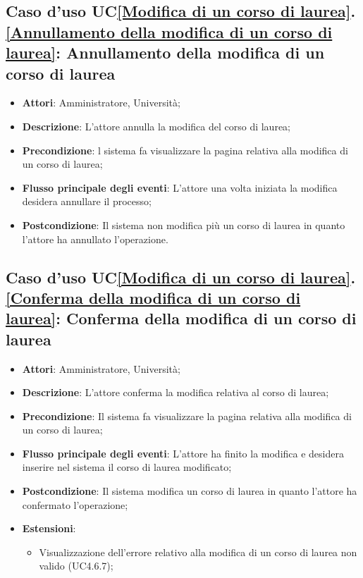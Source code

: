 \subsection{Caso d'uso UC\ref{Modifica di un corso di laurea}.\ref{Annullamento della modifica di un corso di laurea}: Annullamento della modifica di un corso di laurea}
\begin{itemize}
	\item \textbf{Attori}: Amministratore, Università;
	\item \textbf{Descrizione}: L'attore annulla la modifica del corso di laurea;
	
	\item \textbf{Precondizione}: l sistema fa visualizzare la pagina relativa alla modifica di un corso di laurea;
	
	\item \textbf{Flusso principale degli eventi}: L'attore una volta iniziata la modifica desidera annullare il processo;
	
	\item \textbf{Postcondizione}: Il sistema non modifica più un corso di laurea in quanto l'attore ha annullato l'operazione.
	
\end{itemize}

\subsection{Caso d'uso UC\ref{Modifica di un corso di laurea}.\ref{Conferma della modifica di un corso di laurea}: Conferma della modifica di un corso di laurea}
\begin{itemize}
	\item \textbf{Attori}: Amministratore, Università;
	\item \textbf{Descrizione}: L'attore conferma la modifica relativa al corso di laurea;
	
	\item \textbf{Precondizione}: Il sistema fa visualizzare la pagina relativa alla modifica di un corso di laurea;
	
	
	\item \textbf{Flusso principale degli eventi}: L'attore ha finito la modifica e desidera inserire nel sistema il corso di laurea modificato;
	
	\item \textbf{Postcondizione}: Il sistema modifica un corso di laurea in quanto l'attore ha confermato l'operazione;
	
	\item \textbf{Estensioni}:
	\begin{itemize}
		\item Visualizzazione dell'errore relativo alla modifica di un corso di laurea non valido (UC4.6.7);
	\end{itemize}
\end{itemize}


